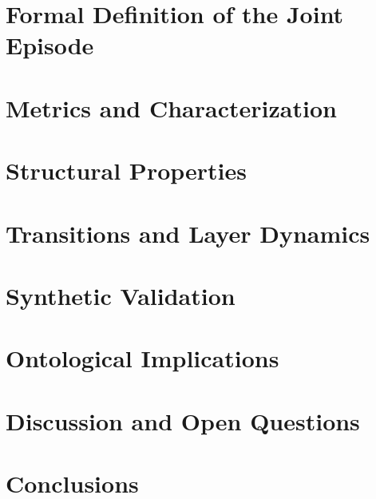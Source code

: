 \documentclass[11pt,a4paper]{article}
\begin{document}
\section{Formal Definition of the Joint Episode}


\section{Metrics and Characterization}


\section{Structural Properties}


\section{Transitions and Layer Dynamics}


\section{Synthetic Validation}


\section{Ontological Implications}


\section{Discussion and Open Questions}


\section{Conclusions}


\nocite{*}
\printbibliography[heading=none]
\end{document}

